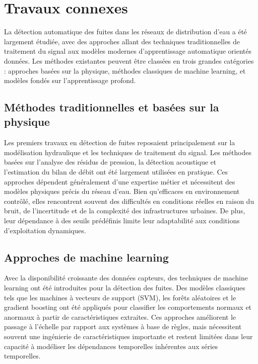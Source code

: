\section{Travaux connexes}

La détection automatique des fuites dans les réseaux de distribution d'eau a
été largement étudiée, avec des approches allant des techniques traditionnelles
de traitement du signal aux modèles modernes d'apprentissage automatique orientés
données. Les méthodes existantes peuvent être classées en trois grandes
catégories : approches basées sur la physique, méthodes classiques de machine
learning, et modèles fondés sur l'apprentissage profond.

\subsection{Méthodes traditionnelles et basées sur la physique}

Les premiers travaux en détection de fuites reposaient principalement sur la
modélisation hydraulique et les techniques de traitement du signal. Les méthodes
basées sur l'analyse des résidus de pression, la détection acoustique et
l'estimation du bilan de débit ont été largement utilisées en pratique. Ces
approches dépendent généralement d'une expertise métier et nécessitent des
modèles physiques précis du réseau d'eau. Bien qu'efficaces en environnement
contrôlé, elles rencontrent souvent des difficultés en conditions réelles en
raison du bruit, de l'incertitude et de la complexité des infrastructures
urbaines. De plus, leur dépendance à des seuils prédéfinis limite leur
adaptabilité aux conditions d'exploitation dynamiques.

\subsection{Approches de machine learning}

Avec la disponibilité croissante des données capteurs, des techniques de machine
learning ont été introduites pour la détection des fuites. Des modèles classiques
tels que les machines à vecteurs de support (SVM), les forêts aléatoires et le
gradient boosting ont été appliqués pour classifier les comportements normaux
et anormaux à partir de caractéristiques extraites. Ces approches améliorent le
passage à l'échelle par rapport aux systèmes à base de règles, mais nécessitent
souvent une ingénierie de caractéristiques importante et restent limitées dans
leur capacité à modéliser les dépendances temporelles inhérentes aux séries
temporelles.

